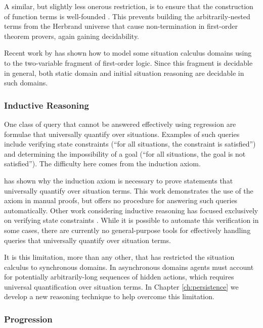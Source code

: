 A similar, but slightly less onerous restriction, is to ensure that
the construction of function terms is well-founded \citep{levesque04krr_book}.
This prevents building the arbitrarily-nested terms from the Herbrand
universe that cause non-termination in first-order theorem provers,
again gaining decidability.

Recent work by \citet{yu07twovar_sitcalc} has shown how to model
some situation calculus domains using to the two-variable fragment
of first-order logic. Since this fragment is decidable in general,
both static domain and initial situation reasoning are decidable in
such domains.


\subsubsection{Inductive Reasoning}

One class of query that cannot be answered effectively using regression
are formulae that universally quantify over situations. Examples of
such queries include verifying state constraints ({}``for all situations,
the constraint is satisfied'') and determining the impossibility
of a goal ({}``for all situations, the goal is not satisfied'').
The difficulty here comes from the induction axiom.

\citet{Reiter93proving} has shown why the induction axiom is necessary
to prove statements that universally quantify over situation terms.
This work demonstrates the use of the axiom in manual proofs, but
offers no procedure for answering such queries automatically. Other
work considering inductive reasoning has focused exclusively on verifying
state constraints \citep{Lin94-StateConstraints,bertossi96automating}.
While it is possible to automate this verification in some cases,
there are currently no general-purpose tools for effectively handling
queries that universally quantify over situation terms.

It is this limitation, more than any other, that has restricted the
situation calculus to synchronous domains. In asynchronous domains
agents must account for potentially arbitrarily-long sequences of
hidden actions, which requires universal quantification over situation
terms. In Chapter \ref{ch:persistence} we develop a new reasoning
technique to help overcome this limitation.


\subsubsection{Progression\label{sec:Background:Progression}}


